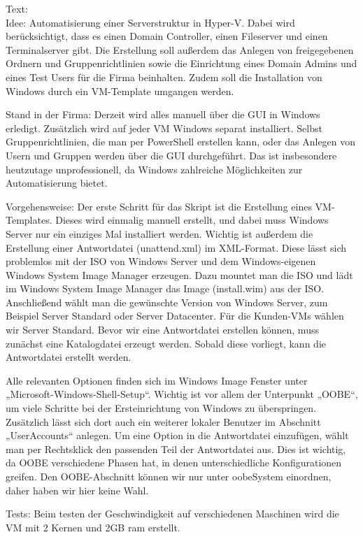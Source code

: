 \documentclass[conference]{IEEEtran}
\begin{document}
Text:\\

Idee:
Automatisierung einer Serverstruktur in Hyper-V. Dabei wird berücksichtigt, dass es einen Domain Controller, einen Fileserver und einen Terminalserver gibt. Die Erstellung soll außerdem das Anlegen von freigegebenen Ordnern und Gruppenrichtlinien sowie die Einrichtung eines Domain Admins und eines Test Users für die Firma beinhalten. Zudem soll die Installation von Windows durch ein VM-Template umgangen werden.

Stand in der Firma:
Derzeit wird alles manuell über die GUI in Windows erledigt. Zusätzlich wird auf jeder VM Windows separat installiert. Selbst Gruppenrichtlinien, die man per PowerShell erstellen kann, oder das Anlegen von Usern und Gruppen werden über die GUI durchgeführt. Das ist insbesondere heutzutage unprofessionell, da Windows zahlreiche Möglichkeiten zur Automatisierung bietet.

Vorgehensweise:
Der erste Schritt für das Skript ist die Erstellung eines VM-Templates. Dieses wird einmalig manuell erstellt, und dabei muss Windows Server nur ein einziges Mal installiert werden. Wichtig ist außerdem die Erstellung einer Antwortdatei (unattend.xml) im XML-Format. Diese lässt sich problemlos mit der ISO von Windows Server und dem Windows-eigenen Windows System Image Manager erzeugen. Dazu mountet man die ISO und lädt im Windows System Image Manager das Image (install.wim) aus der ISO. Anschließend wählt man die gewünschte Version von Windows Server, zum Beispiel Server Standard oder Server Datacenter. Für die Kunden-VMs wählen wir Server Standard. Bevor wir eine Antwortdatei erstellen können, muss zunächst eine Katalogdatei erzeugt werden. Sobald diese vorliegt, kann die Antwortdatei erstellt werden.

Alle relevanten Optionen finden sich im Windows Image Fenster unter „Microsoft-Windows-Shell-Setup“. Wichtig ist vor allem der Unterpunkt „OOBE“, um viele Schritte bei der Ersteinrichtung von Windows zu überspringen. Zusätzlich lässt sich dort auch ein weiterer lokaler Benutzer im Abschnitt „UserAccounts“ anlegen. Um eine Option in die Antwortdatei einzufügen, wählt man per Rechtsklick den passenden Teil der Antwortdatei aus. Dies ist wichtig, da OOBE verschiedene Phasen hat, in denen unterschiedliche Konfigurationen greifen. Den OOBE-Abschnitt können wir nur unter oobeSystem einordnen, daher haben wir hier keine Wahl.

Tests:
Beim testen der Geschwindigkeit auf verschiedenen Maschinen wird die VM mit 2 Kernen und 2GB ram erstellt.


\end{document}
